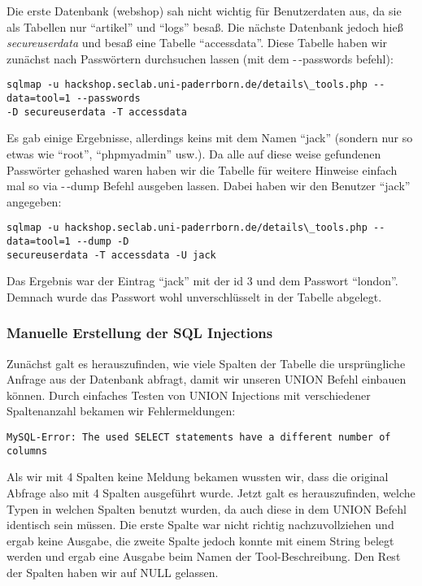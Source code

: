 \documentclass[10pt,a4paper]{article}
\begin{document}
Die erste Datenbank (webshop) sah nicht wichtig für Benutzerdaten aus, da sie als Tabellen nur "`artikel"' und "`logs"' besaß. Die nächste Datenbank jedoch hieß \textit{secureuserdata} und besaß eine Tabelle "`accessdata"'.
Diese Tabelle haben wir zunächst nach Passwörtern durchsuchen lassen (mit dem -\,-passwords befehl):

\begin{verbatim}
sqlmap -u hackshop.seclab.uni-paderrborn.de/details\_tools.php --data=tool=1 --passwords
-D secureuserdata -T accessdata
\end{verbatim}

Es gab einige Ergebnisse, allerdings keins mit dem Namen "`jack"' (sondern nur so etwas wie "`root"', "`phpmyadmin"' usw.). Da alle auf diese weise gefundenen Passwörter gehashed waren haben wir die Tabelle für weitere Hinweise einfach mal so via -\,-dump Befehl ausgeben lassen. Dabei haben wir den Benutzer "`jack"' angegeben:

\begin{verbatim}
sqlmap -u hackshop.seclab.uni-paderrborn.de/details\_tools.php --data=tool=1 --dump -D
secureuserdata -T accessdata -U jack
\end{verbatim}

Das Ergebnis war der Eintrag "`jack"' mit der id 3 und dem Passwort "`london"'. Demnach wurde das Passwort wohl unverschlüsselt in der Tabelle abgelegt.


\subsubsection*{Manuelle Erstellung der SQL Injections}

Zunächst galt es herauszufinden, wie viele Spalten der Tabelle die ursprüngliche Anfrage aus der Datenbank abfragt, damit wir unseren UNION Befehl einbauen können. Durch einfaches Testen von UNION Injections mit verschiedener Spaltenanzahl bekamen wir Fehlermeldungen:

\begin{verbatim}
MySQL-Error: The used SELECT statements have a different number of columns
\end{verbatim}

Als wir mit 4 Spalten keine Meldung bekamen wussten wir, dass die original Abfrage also mit 4 Spalten ausgeführt wurde. Jetzt galt es herauszufinden, welche Typen in welchen Spalten benutzt wurden, da auch diese in dem UNION Befehl identisch sein müssen. Die erste Spalte war nicht richtig nachzuvollziehen und ergab keine Ausgabe, die zweite Spalte jedoch konnte mit einem String belegt werden und ergab eine Ausgabe beim Namen der Tool-Beschreibung. Den Rest der Spalten haben wir auf NULL gelassen.
\end{document}
